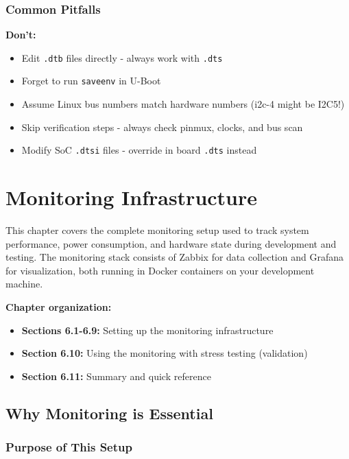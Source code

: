 \documentclass[12pt,a4paper]{report}
\begin{document}
\subsection{Common Pitfalls}

\begin{important}
\textbf{Don't:}
\begin{itemize}
    \item Edit \texttt{.dtb} files directly - always work with \texttt{.dts}
    \item Forget to run \texttt{saveenv} in U-Boot
    \item Assume Linux bus numbers match hardware numbers (i2c-4 might be I2C5!)
    \item Skip verification steps - always check pinmux, clocks, and bus scan
    \item Modify SoC \texttt{.dtsi} files - override in board \texttt{.dts} instead
\end{itemize}
\end{important}

\chapter{Monitoring Infrastructure}

This chapter covers the complete monitoring setup used to track system performance, power consumption, and hardware state during development and testing. The monitoring stack consists of Zabbix for data collection and Grafana for visualization, both running in Docker containers on your development machine.

\textbf{Chapter organization:}
\begin{itemize}
    \item \textbf{Sections 6.1-6.9:} Setting up the monitoring infrastructure
    \item \textbf{Section 6.10:} Using the monitoring with stress testing (validation)
    \item \textbf{Section 6.11:} Summary and quick reference
\end{itemize}

\section{Why Monitoring is Essential}

\subsection{Purpose of This Setup}
\end{document}

